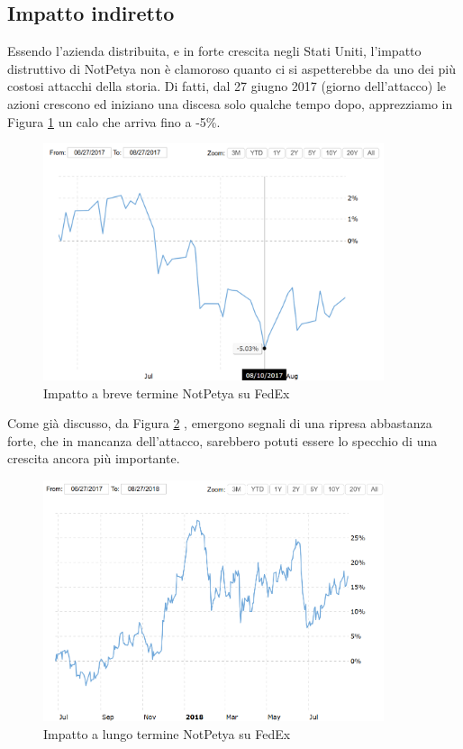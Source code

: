 \documentclass[12pt,a4paper,twoside]{report}
\begin{document}
\subsection{Impatto indiretto}
Essendo l'azienda distribuita, e in forte crescita negli Stati Uniti, l'impatto distruttivo di NotPetya non \`e clamoroso quanto ci si aspetterebbe da uno dei pi\`u costosi attacchi della storia. Di fatti, dal 27 giugno 2017 (giorno dell'attacco) le azioni crescono ed iniziano una discesa solo qualche tempo dopo, apprezziamo in Figura \ref{fig:fdx1} \cite{macrotrends_fedex} un calo che arriva fino a -5\%.\\
\begin{figure}[H] 
\begin{center} 
\includegraphics[width=10cm]{figures/fedex_short.png} 
\caption[Grafico FedEx NotPetya short]{Impatto a breve termine NotPetya su FedEx}\label{fig:fdx1}
\end{center}
\end{figure}

Come gi\`a discusso, da Figura \ref{fig:fdx2} \cite{macrotrends_fedex}, emergono segnali di una ripresa abbastanza forte, che in mancanza dell'attacco, sarebbero potuti essere lo specchio di una crescita  ancora pi\`u importante.

\begin{figure}[H] 
\begin{center} 
\includegraphics[width=10cm]{figures/fedex_long.png} 
\caption[Grafico FedEx NotPetya long]{Impatto a lungo termine NotPetya su FedEx}\label{fig:fdx2}
\end{center}
\end{figure}
\end{document}
